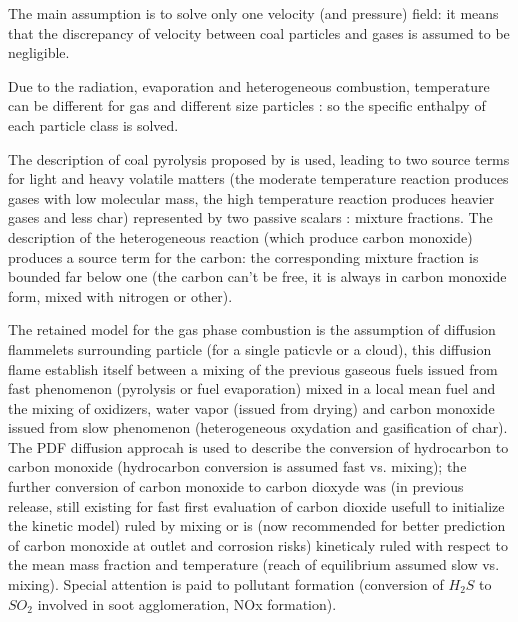The main assumption is to solve only one velocity (and pressure) field: it
means that the discrepancy of velocity between coal particles and
gases is assumed to be negligible.

Due to the radiation, evaporation and heterogeneous combustion, temperature can
be different for gas and different size particles : so the specific enthalpy of
each particle class is solved.

The description of coal pyrolysis proposed by \cite{Kobayashi:1976} is used, leading to two
source terms for light and heavy volatile matters (the moderate temperature
reaction produces gases with low molecular mass, the high temperature reaction
produces heavier gases and less char) represented by two passive scalars :
mixture fractions.  The description of the heterogeneous reaction (which produce
carbon monoxide) produces a source term for the carbon: the corresponding
mixture fraction is bounded far below one (the carbon can't be free, it is
always in carbon monoxide form, mixed with nitrogen or other).

The retained model for the gas phase combustion is the assumption of diffusion
flammelets surrounding particle (for a single paticvle or a cloud), this
diffusion flame establish itself between a mixing of the previous gaseous fuels
issued from fast phenomenon (pyrolysis or fuel evaporation) mixed in a local
mean fuel and the mixing of oxidizers, water vapor (issued from drying) and
carbon monoxide issued from slow phenomenon (heterogeneous oxydation and
gasification of char). The PDF diffusion approcah is used to describe the
conversion of hydrocarbon to carbon monoxide (hydrocarbon conversion is assumed
fast vs. mixing); the further conversion of carbon monoxide to carbon dioxyde
was (in previous release, still existing for fast first evaluation of carbon
dioxide usefull to initialize the kinetic model) ruled by mixing or is (now
recommended for better prediction of carbon monoxide at outlet and corrosion
risks) kineticaly ruled with respect to the mean mass fraction and temperature
(reach of equilibrium assumed slow vs. mixing). Special attention is paid to
pollutant formation (conversion of $H_{2}S$ to $SO_{2}$ involved in soot
agglomeration, NOx formation).

\newpage
